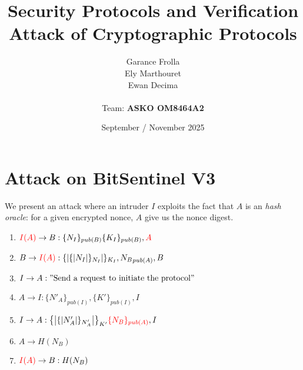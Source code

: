 \documentclass[11pt]{article}
\begin{document}
    \title{
            { \textbf{Security Protocols and Verification}} \\[1ex]
        {\small Attack of Cryptographic Protocols}
    }


    \author{
        Garance Frolla \\
        Ely Marthouret \\
        Ewan Decima\\ \\
        Team: \textbf{ASKO OM8464A2}
    }

    \date{September / November 2025}

    \maketitle
    \tableofcontents
    \newpage

    \section{Attack on BitSentinel V3}


    We present an attack where an intruder $I$ exploits the fact that $A$ is an \textit{hash oracle}: for a given
    encrypted nonce, $A$ give us the nonce digest.


    \begin{enumerate}

        \item $\textcolor{red}{I(A)} \rightarrow B: \{N_I\}_{pub(B)} \{K_I\}_{pub(B)}, \textcolor{red}{A}$
        \item $B \rightarrow \textcolor{red}{I(A)} : \{|\{|N_I|\}_{N_I}|\}_{K_I}, {N_B}_{pub(A)}, B$
        \item $I \rightarrow A : "\text{Send a request to initiate the protocol}"$
        \item $A\rightarrow I : \{N'_A\}_{pub(I)}, \{K'\}_{pub(I)}, I$
        \item $I \rightarrow A : \bigl\{\bigl| \{|N'_A|\}_{N'_A}  \bigr|\bigr\}_{K'} \textcolor{red}{ \{N_B\}_{pub(A)}}, I$
        \item $A \rightarrow H(N_B)$
        \item $\textcolor{red}{I(A)} \rightarrow B: H(N_B)$

    \end{enumerate}
\end{document}
